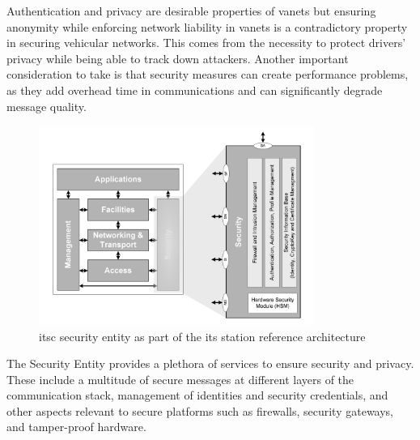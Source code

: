 Authentication and privacy are desirable properties of \glspl{vanet} but ensuring anonymity while enforcing network liability in \glspl{vanet} is a contradictory property in securing vehicular networks. This comes from the necessity to protect drivers' privacy while being able to track down attackers. \cite{jiang_ieee_2008} \cite{malhi_security_2020}
Another important consideration to take is that security measures can create performance problems, as they add overhead time in communications and can significantly degrade message quality. \cite{toor_vehicle_2008}
\cite{etsi_intelligent_2010-1}


\begin{figure}[htbp]
    \centering
    \includegraphics[width=0.8\textwidth]{Chapters/Figures/VANETs/security_entity.png}
   	\caption{\gls{itsc} security entity as part of the \gls{its} station reference architecture~\cite{etsi_intelligent_2010}}
   	\label{fig:security_entity}
\end{figure}


The Security Entity provides a plethora of services to ensure security and privacy. These include a multitude of secure messages at different layers of the communication stack, management of identities and security credentials, and other aspects relevant to secure platforms such as firewalls, security gateways, and tamper-proof hardware.
\cite{etsi_intelligent_2014}

